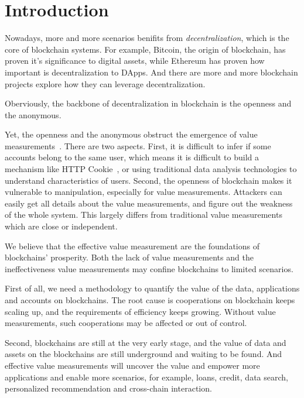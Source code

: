 
\section{Introduction}

Nowadays, more and more scenarios benifits from \emph{decentralization}, which
is the core of blockchain systems. For example, Bitcoin, the origin of
blockchain, has proven it's significance to digital assets, while Ethereum has
proven how important is decentralization to DApps. And there are more and more
blockchain projects explore how they can leverage decentralization.

Oberviously, the backbone of decentralization in blockchain is the openness and the
anonymous.


Yet, the openness and the anonymous obstruct the emergence of value
measurements~\cite{meiklejohn2013fistful}. There are two aspects. First, it is
difficult to infer if some accounts belong to the same user, which means it is
difficult to build a mechanism like HTTP Cookie~\cite{Cookie}, or using
traditional data analysis technologies to understand characteristics of users.
Second, the openness of blockchain makes it vulnerable to manipulation,
especially for value measurements. Attackers can easily get all details about the
value measurements, and figure out the weakness of the whole system. This
largely differs from traditional value measurements which are close or
independent.

We believe that the effective value measurement are the foundations of
blockchains' prosperity. Both the lack of value measurements and the
ineffectiveness value measurements may confine blockchains to limited
scenarios.

First of all, we need a methodology to quantify the value of the data,
applications and accounts on blockchains. The root cause is cooperations on
blockchain keeps scaling up, and the requirements of efficiency
keeps growing. Without value measurements, such cooperations may be affected or
out of control.

Second, blockchains are still at the very early stage, and the value of data
and assets on the blockchains are still underground and waiting to be found.
And effective value measurements will uncover the value and empower more
applications and enable more scenarios, for example, loans, credit, data
search, personalized recommendation and cross-chain interaction.

